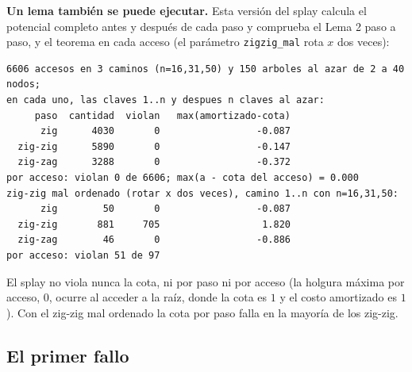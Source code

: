 \documentclass[11pt]{article}
\begin{document}
\textbf{Un lema también se puede ejecutar.} Esta versión del splay calcula el potencial completo antes y después de cada paso y
comprueba el Lema 2 paso a paso, y el teorema en cada acceso (el parámetro \texttt{zigzig\_mal} rota $x$ dos veces):



\noindent\begin{minipage}{\linewidth}
\begin{lstlisting}[style=salida,basicstyle=\ttfamily\footnotesize,columns=fixed,xleftmargin=7pt,xrightmargin=7pt]
6606 accesos en 3 caminos (n=16,31,50) y 150 arboles al azar de 2 a 40 nodos;
en cada uno, las claves 1..n y despues n claves al azar:
     paso  cantidad  violan   max(amortizado-cota)
      zig      4030       0                 -0.087
  zig-zig      5890       0                 -0.147
  zig-zag      3288       0                 -0.372
por acceso: violan 0 de 6606; max(a - cota del acceso) = 0.000
zig-zig mal ordenado (rotar x dos veces), camino 1..n con n=16,31,50:
      zig        50       0                 -0.087
  zig-zig       881     705                  1.820
  zig-zag        46       0                 -0.886
por acceso: violan 51 de 97
\end{lstlisting}
\end{minipage}

El splay no viola nunca la cota, ni por paso ni por acceso (la holgura máxima por acceso, $0$, ocurre al acceder a la raíz, donde
la cota es $1$ y el costo amortizado es $1$). Con el zig-zig mal ordenado la cota por paso falla en la mayoría de los zig-zig.

\subsection*{El primer fallo}
\end{document}
